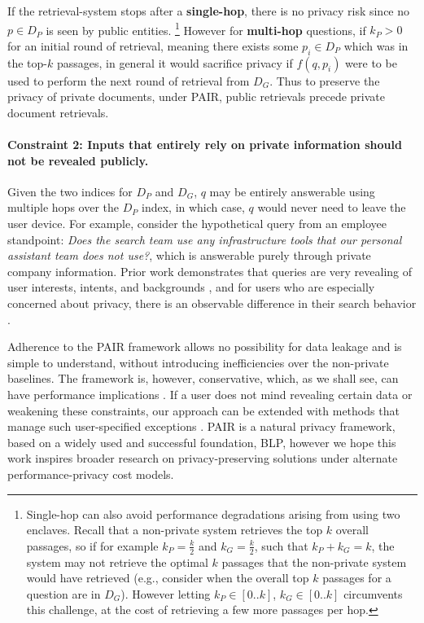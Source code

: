 \documentclass{article}
\renewcommand\cite{\citep}	\newcommand\shortcite{\citeyearpar}\newcommand\newcite{\citet}
\newcommand{\problemshortname}{\textsc{PAIR}\xspace}
\begin{document}
If the retrieval-system stops after a \textbf{single-hop}, there is no privacy risk since no $p \in D_P$ is seen by public entities. \footnote{Single-hop can also avoid performance degradations arising from using two enclaves. Recall that a non-private system retrieves the top $k$ overall passages, so if for example $k_P = \frac{k}{2}$ and $k_G = \frac{k}{2}$, such that $k_P + k_G = k$, the system may not retrieve the optimal $k$ passages that the non-private system would have retrieved (e.g., consider when the overall top $k$ passages for a question are in $D_G$). However letting $k_P \in [0 .. k]$,  $k_G \in [0 .. k]$ circumvents this challenge, at the cost of retrieving a few more passages per hop.}
However for \textbf{multi-hop} questions, if $k_P > 0$ for an initial round of retrieval, meaning there exists some $p_i \in {D_P}$ which was in the top-$k$ passages, in general it would sacrifice privacy if $f(q, p_i)$ were to be used to perform the next round of retrieval from $D_G$. Thus to preserve the privacy of private documents, under \problemshortname, public retrievals precede private document retrievals. 


\paragraph{Constraint 2: Inputs that entirely rely on private information should not be revealed publicly.} Given the two indices for ${D_P}$ and ${D_G}$, $q$ may be entirely answerable using multiple hops over the ${D_P}$ index, in which case, $q$ would never need to leave the user device. For example, consider the hypothetical query from an employee standpoint: \textit{Does the search team use any infrastructure tools that our personal assistant team does not use?}, which is answerable purely through private company information.
Prior work demonstrates that queries are very revealing of user interests, intents, and backgrounds \cite{xu2007personalsearch, gervais2014queryobfusc, hill2012target}, and for users who are especially concerned about privacy, there is an observable difference in their search behavior \cite{zimmerman2019querybehavior}. 


Adherence to the \problemshortname framework allows no possibility for data leakage and is simple to understand, without introducing inefficiencies over the non-private baselines. The framework is, however, conservative, which, as we shall see, can have performance implications . 
If a user does not mind revealing certain data or weakening these constraints, our approach can be extended with methods that manage such user-specified exceptions \cite{xu2007personalsearch, shou2014personalsearch}. \problemshortname is a natural privacy framework, based on a widely used and successful foundation, BLP, however we hope this work inspires broader research on privacy-preserving solutions under alternate performance-privacy cost models. 
\end{document}
